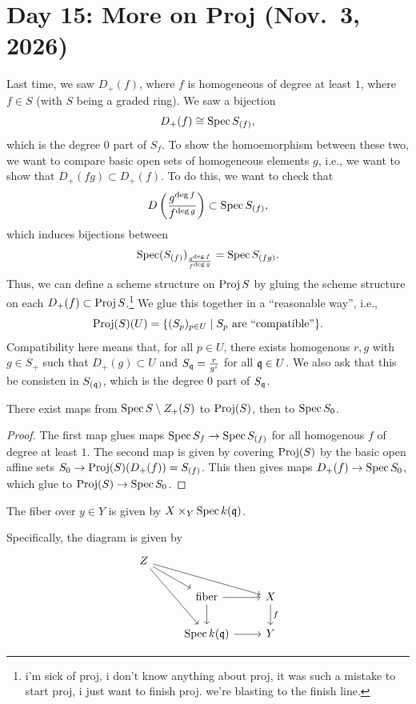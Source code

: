 \section{Day 15: More on Proj (Nov.\ 3, 2026)}
Last time, we saw $D_+(f)$, where $f$ is homogeneous of degree at least $1$, where $f \in S$ (with $S$ being a graded ring). We saw a bijection
\[ D_+(f) \cong \operatorname{Spec} S_{(f)}, \]
which is the degree $0$ part of $S_f$. To show the homoemorphism between these two, we want to compare basic open sets of homogeneous elements $g$, i.e., we want to show that $D_+(fg) \subset D_+(f)$. To do this, we want to check that
\[ D\left(\frac{g^{\deg f}}{f^{\deg g}}\right) \subset \operatorname{Spec} S_{(f)}, \]
which induces bijections between
\[ \operatorname{Spec}(S_{(f)})_{\frac{g^{\deg f}}{f^{\deg g}}} = \operatorname{Spec} S_{(fg)}. \]
Thus, we can define a scheme structure on $\operatorname{Proj} S$ by gluing the scheme structure on each $D_+(f) \subset \operatorname{Proj} S$.\footnote{i'm sick of proj, i don't know anything about proj, it was such a mistake to start proj, i just want to finish proj. we're blasting to the finish line.} We glue this together in a ``reasonable way'', i.e.,
\[ \operatorname{Proj}(S)(U) = \{(S_p)_{p \in U} \mid S_p \text{ are ``compatible''}\}. \]
Compatibility here means that, for all $p \in U$, there exists homogenous $r, g$ with $g \in S_+$ such that $D_+(g) \subset U$ and $S_\mathfrak q = \frac{r}{g^i}$ for all $\mathfrak q \in U$. We also ask that this be consisten in $S_{(\mathfrak q)}$, which is the degree $0$ part of $S_\mathfrak q$.

\begin{theorem} \label{thm:proj_maps}
    There exist maps from $\operatorname{Spec} S \setminus Z_+(S)$ to $\operatorname{Proj}(S)$, then to $\operatorname{Spec} S_0$.
\end{theorem}
\begin{proof}
    The first map glues maps $\operatorname{Spec} S_f \to \operatorname{Spec} S_{(f)}$ for all homogenous $f$ of degree at least $1$. The second map is given by covering $\operatorname{Proj}(S)$ by the basic open affine sets $S_0 \to \operatorname{Proj}(S)(D_+(f)) = S_{(f)}$. This then gives maps $D_+(f) \to \operatorname{Spec} S_0$, which glue to $\operatorname{Proj}(S) \to \operatorname{Spec} S_0$.
\end{proof}

\begin{definition} \label{defn:fiber_of_scheme}
    The fiber over $y \in Y$ is given by $X \times_Y \operatorname{Spec} k(\mathfrak q)$.
\end{definition}
Specifically, the diagram is given by
\[
    \begin{tikzcd}
        Z \arrow[rrd] \arrow[rdd] \arrow[rd] \\
        & \text{fiber} \arrow[r] \arrow[d] & X \arrow[d, "f"] \\
        & \Spec k(\kq) \arrow[r] & Y
    \end{tikzcd}
\]

